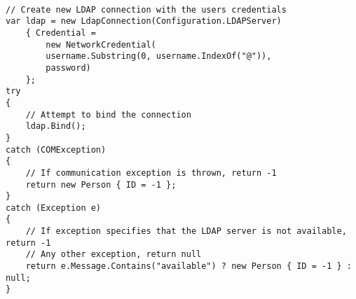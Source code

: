 \begin{lstlisting}[caption=Kode til godkendelse af login, label=AD-AUTH]

// Create new LDAP connection with the users credentials
var ldap = new LdapConnection(Configuration.LDAPServer) 
	{ Credential =
	    new NetworkCredential(
		username.Substring(0, username.IndexOf("@")), 
		password) 
	};
try
{
    // Attempt to bind the connection
    ldap.Bind();
}
catch (COMException)
{
    // If communication exception is thrown, return -1
    return new Person { ID = -1 };
}
catch (Exception e)
{
    // If exception specifies that the LDAP server is not available, return -1
    // Any other exception, return null
    return e.Message.Contains("available") ? new Person { ID = -1 } : null;
}
\end{lstlisting}